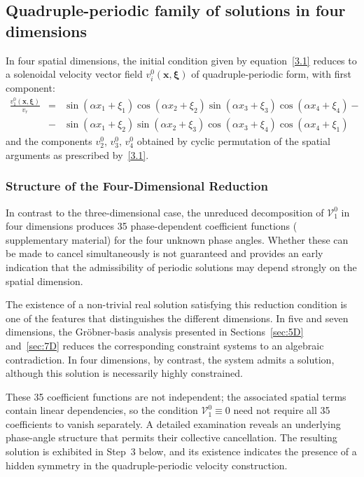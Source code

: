 \documentclass[11pt]{jfm}
\newif\iffullAppendixA
\numberwithin{equation}{section}
\begin{document}
\subsection{Quadruple-periodic family of solutions in four dimensions}
\label{sec:4D}
In four spatial dimensions, the initial condition given by equation~\eqref{3.1} reduces to a solenoidal velocity vector field \( v_i^0(\boldsymbol{x}, \boldsymbol{\xi}) \) of quadruple-periodic form, with first component:
\begin{eqnarray}
\label{4.11}
\frac{v_1^0(\boldsymbol{x}, \boldsymbol{\xi})}{v_r} &=& \sin { \left(\alpha x_1+\xi_1 \right) } \cos {\left(\alpha x_2+\xi_2\right) }\sin { \left(\alpha x_3+\xi_3\right) } \cos { \left(\alpha x_4+\xi_4 \right) }- \nonumber\\
&-&\sin  {\left( \alpha x_1+\xi_2\right) }\sin  {\left( \alpha x_2+\xi_3\right) } \cos  { \left(\alpha x_3+\xi_4 \right) } \cos  {\left( \alpha x_4+\xi_1\right) }
\end{eqnarray}
and the components $v_2^0,\, v_3^0,\, v_4^0$ obtained by cyclic permutation of the spatial arguments as prescribed by~\eqref{3.1}.
\subsubsection{Structure of the Four-Dimensional Reduction}
In contrast to the three-dimensional case, the unreduced decomposition of
\(\mathcal{V}_1^0\) in four dimensions produces 35 phase-dependent coefficient functions (\iffullAppendixA Appendix~\ref{app:4D}\else
supplementary material\fi)
for the four unknown phase angles. Whether these can be made to cancel simultaneously is not
guaranteed and provides an early indication that the admissibility of periodic solutions may depend
strongly on the spatial dimension.

The existence of a non-trivial real solution satisfying this reduction condition is
one of the features that distinguishes the different dimensions. In five and
seven dimensions, the Gr\"{o}bner-basis analysis presented in
Sections~\ref{sec:5D} and~\ref{sec:7D} reduces the corresponding constraint systems to an
algebraic contradiction. In four dimensions, by contrast, the system admits
a solution, although this solution is necessarily highly constrained.

These 35 coefficient functions are not independent; the associated spatial terms contain linear
dependencies, so the condition $\mathcal{V}_1^0\equiv0$ need not require all 35 coefficients to
vanish separately. A detailed examination reveals an underlying phase-angle structure that permits
their collective cancellation. The resulting solution is exhibited in Step~3 below, and its
existence indicates the presence of a hidden symmetry in the quadruple-periodic velocity
construction.
\end{document}
